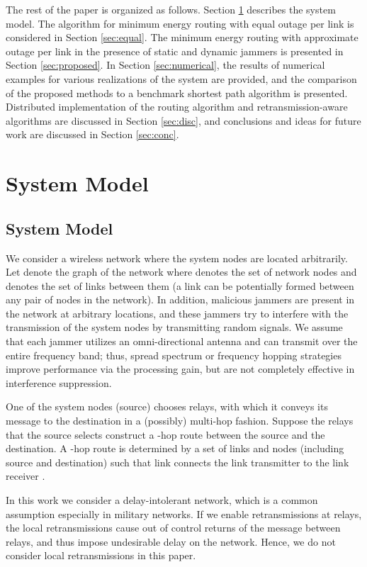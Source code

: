 \documentclass[10pt,journal]{IEEEtran}
\theoremstyle{definition}
\begin{document}
The rest of the paper  is organized as follows. 
Section \ref{sec:system} describes the system
model. 
The algorithm for minimum energy routing with equal outage per link  is considered in Section \ref{sec:equal}.
The  minimum energy routing with approximate outage per link   in the presence of static and dynamic jammers is presented in Section \ref{sec:proposed}. In Section \ref{sec:numerical}, the results of numerical examples
for various realizations of the system are provided, and the comparison of the
proposed methods to a benchmark shortest path algorithm  is presented.
{Distributed implementation of the routing algorithm and retransmission-aware algorithms are discussed in Section \ref{sec:disc}}, and   
conclusions and ideas for future work are
discussed in Section \ref{sec:conc}.
\section{System Model}\label{sec:system}
\subsection{System Model}
We consider a  wireless network where the system nodes are located arbitrarily.
Let  denote the graph of the network where  denotes the set of network nodes and  denotes the set of links between them (a link can be potentially formed between any pair of nodes in the network).
 In addition, malicious jammers are  present in the network at arbitrary locations, and these jammers try to interfere with the transmission of the system nodes by transmitting  random signals. 
 We assume that each jammer utilizes an omni-directional antenna and  can transmit over the entire frequency band;  thus, spread spectrum or frequency hopping strategies  improve performance via the processing gain, but are not completely effective in interference suppression. 
 
 One of the system nodes (source) chooses  relays,  with which it conveys its message to the destination in a (possibly) multi-hop fashion.
Suppose the relays that the source selects construct a -hop route between the source and the destination.
A -hop route  is determined by a set of  links  and  nodes (including source and destination) such that link  connects the  link transmitter  to the  link receiver .

In this work we consider a delay-intolerant network, which is a common assumption especially in military networks.
	If we enable retransmissions at relays, the local retransmissions cause  out of control returns of the message between relays, and thus  impose undesirable delay on the network.
	Hence, we do not consider local retransmissions in this paper.
 
\end{document}

